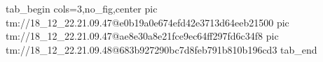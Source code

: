  
 
 
 
 

\qqSecOrig


\ifcmt
  tab_begin cols=3,no_fig,center
    pic tm://18_12_22.21.09.47@e0b19a0e674efd42e3713d64eeb21500
    pic tm://18_12_22.21.09.47@ae8e30a8e21fce9ec64ff297fd6c34f8
    pic tm://18_12_22.21.09.48@683b927290bc7d8feb791b810b196cd3
  tab_end
\fi

